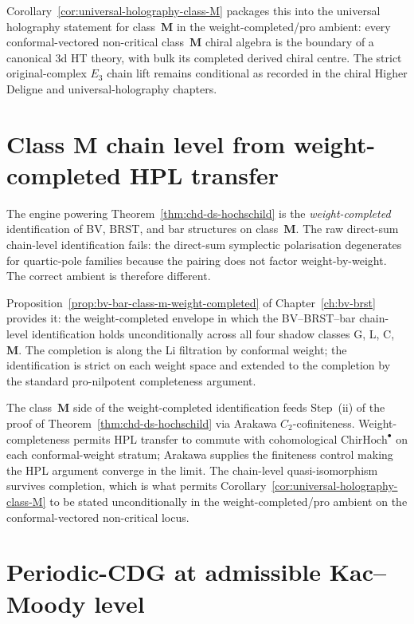 Corollary~\ref{cor:universal-holography-class-M} packages this into
the universal holography statement for class~$\mathbf{M}$ in the
weight-completed/pro ambient: every conformal-vectored non-critical
class~$\mathbf{M}$ chiral algebra is the boundary of a canonical 3d HT
theory, with bulk its completed derived chiral centre. The strict
original-complex $E_3$ chain lift remains conditional as recorded in
the chiral Higher Deligne and universal-holography chapters.

\section{Class $\mathbf{M}$ chain level from weight-completed HPL transfer}
\label{sec:part-viii-class-m-weight-completed}

The engine powering Theorem~\ref{thm:chd-ds-hochschild} is the
\emph{weight-completed} identification of BV, BRST, and bar structures
on class~$\mathbf{M}$. The raw direct-sum chain-level identification
fails: the direct-sum symplectic polarisation degenerates for
quartic-pole families because the pairing does not factor weight-by-weight.
The correct ambient is therefore different.

Proposition~\ref{prop:bv-bar-class-m-weight-completed} of
Chapter~\ref{ch:bv-brst} provides it: the weight-completed envelope
in which the BV--BRST--bar chain-level identification holds
unconditionally across all four shadow classes G, L, C, $\mathbf{M}$.
The completion is along the Li filtration by conformal weight; the
identification is strict on each weight space and extended to the
completion by the standard pro-nilpotent completeness argument.

The class~$\mathbf{M}$ side of the weight-completed identification
feeds Step~(ii) of the proof of Theorem~\ref{thm:chd-ds-hochschild}
via Arakawa $C_{2}$-cofiniteness. Weight-completeness permits HPL
transfer to commute with cohomological $\mathrm{ChirHoch}^{\bullet}$
on each conformal-weight stratum; Arakawa supplies the finiteness
control making the HPL argument converge in the limit. The chain-level
quasi-isomorphism survives completion, which is what permits
Corollary~\ref{cor:universal-holography-class-M} to be stated
unconditionally in the weight-completed/pro ambient on the
conformal-vectored non-critical locus.

\section{Periodic-CDG at admissible Kac--Moody level}
\label{sec:part-viii-periodic-cdg}

